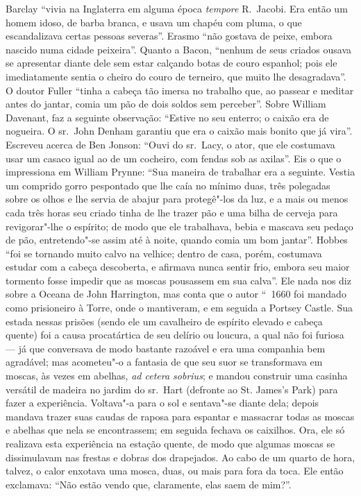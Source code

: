 Barclay “vivia na Inglaterra em alguma época \textit{tempore} R.~Jacobi.
Era então um homem idoso, de barba branca, e usava um chapéu com pluma, o
que escandalizava certas pessoas severas”. Erasmo “não gostava de peixe,
embora nascido numa cidade peixeira”. Quanto a Bacon, “nenhum de seus
criados ousava se apresentar diante dele sem estar calçando botas de couro
espanhol; pois ele imediatamente sentia o cheiro do couro de terneiro, que
muito lhe desagradava”. O doutor Fuller “tinha a cabeça tão imersa no
trabalho que, ao passear e meditar antes do jantar, comia um pão de dois
soldos sem perceber”. Sobre William Davenant, faz a seguinte observação:
“Estive no seu enterro; o caixão era de nogueira. O sr.~John Denham
garantiu que era o caixão mais bonito que já vira”. Escreveu
acerca de Ben Jonson: “Ouvi do sr.~Lacy, o ator, que ele costumava usar
um casaco igual ao de um cocheiro, com fendas sob as axilas”. Eis o que o
impressiona em William Prynne: “Sua maneira de trabalhar era a seguinte.
Vestia um comprido gorro pespontado que lhe caía no mínimo duas, três
polegadas sobre os olhos e lhe servia de abajur para protegê"-los da luz, e
a mais ou menos cada três horas seu criado tinha de lhe trazer pão e uma
bilha de cerveja para revigorar"-lhe o espírito; de modo que ele
trabalhava, bebia e mascava seu pedaço de pão, entretendo"-se assim até à
noite, quando comia um bom jantar”. Hobbes “foi se tornando muito calvo na
velhice; dentro de casa, porém, costumava estudar com a cabeça descoberta,
e afirmava nunca sentir frio, embora seu maior tormento fosse impedir que
as moscas pousassem em sua calva”. Ele nada nos diz sobre a
 Oceana de John Harrington, mas conta que o autor “~1660 
 foi mandado como prisioneiro à Torre, onde o mantiveram,
e em seguida a Portsey Castle. Sua estada nessas prisões (sendo ele um
cavalheiro de espírito elevado e cabeça quente) foi a causa procatártica
de seu delírio ou loucura, a qual não foi furiosa --- já que conversava de
modo bastante razoável e era uma companhia bem agradável; mas acometeu"-o a
fantasia de que seu suor se transformava em moscas, às vezes em abelhas,
\textit{ad cetera sobrius}; e mandou construir uma casinha versátil de
madeira no jardim do sr.~Hart (defronte ao St. James’s Park) para fazer a
experiência. Voltava"-a para o sol e sentava"-se diante dela; depois mandava
trazer suas caudas de raposa para espantar e massacrar todas as moscas e
abelhas que nela se encontrassem; em seguida fechava os caixilhos. Ora,
ele só realizava esta experiência na estação quente, de modo que algumas
moscas se dissimulavam nas frestas e dobras dos drapejados. Ao cabo de um
quarto de hora, talvez, o calor enxotava uma mosca, duas, ou mais para
fora da toca. Ele então exclamava: “Não estão vendo que, claramente, elas
saem de mim?”.

